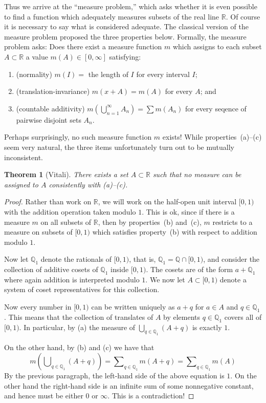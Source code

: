 \documentclass[11pt,oneside]{amsbook}
\newcommand{\QQ}{{\mathbb Q}}
\newcommand{\RR}{{\mathbb R}}
\theoremstyle{definition}
\theoremstyle{plain}
\newtheorem{thm}{Theorem}[section]
\theoremstyle{definition}
\theoremstyle{remark}
\numberwithin{equation}{section}
\numberwithin{figure}{section}
\begin{document}
Thus we arrive at the ``measure problem,'' which asks whether it is even possible to find a function which adequately measures subsets of the real line $\RR$. Of course it is necessary to say what is considered adequate. The classical version of the measure problem proposed the three properties below. Formally, the measure problem asks: Does there exist a measure function $m$ which assigns to each subset $A\subset\RR$ a value $m(A)\in[0,\infty]$ satisfying:
\begin{enumerate}
\item (normality) $m(I)=$ the length of $I$ for every interval $I$;
\item (translation-invariance) $m(x+A)=m(A)$ for every $A$; and
\item (countable additivity) $m(\bigcup_{n=1}^{\infty} A_n)=\sum m(A_n)$ for every seqence of pairwise disjoint sets $A_n$.
\end{enumerate}

Perhaps surprisingly, no such measure function $m$ exists! While properties~(a)--(c) seem very natural, the three items unfortunately turn out to be mutually inconsistent.

\begin{thm}[Vitali]
  There exists a set $A\subset\RR$ such that no measure can be assigned to $A$ consistently with (a)--(c).
\end{thm}

\begin{proof}
  Rather than work on $\RR$, we will work on the half-open unit interval $[0,1)$ with the addition operation taken modulo $1$. This is ok, since if there is a measure $m$ on all subsets of $\RR$, then by properties~(b) and~(c), $m$ restricts to a measure on subsets of $[0,1)$ which satisfies property~(b) with respect to addition modulo $1$.

  Now let $\QQ_1$ denote the rationals of $[0,1)$, that is, $\QQ_1=\QQ\cap[0,1)$, and consider the collection of additive cosets of $\QQ_1$ inside $[0,1)$. The cosets are of the form $a+\QQ_1$ where again addition is interpreted modulo $1$. We now let $A\subset[0,1)$ denote a system of coset representatives for this collection.

  Now every number in $[0,1)$ can be written uniquely as $a+q$ for $a\in A$ and $q\in\QQ_1$. This means that the collection of translates of $A$ by elements $q\in\QQ_1$ covers all of $[0,1)$. In particular, by (a) the measure of $\bigcup_{q\in\QQ_1}(A+q)$ is exactly $1$.

  On the other hand, by (b) and (c) we have that
  \[m\left(\bigcup\nolimits_{q\in\QQ_1}(A+q)\right)
  =\sum\nolimits_{q\in\QQ_1}m(A+q)=\sum\nolimits_{q\in\QQ_1}m(A)
  \]
  By the previous paragraph, the left-hand side of the above equation is $1$. On the other hand the right-hand side is an infinite sum of some nonnegative constant, and hence must be either $0$ or $\infty$. This is a contradiction!
\end{proof}
\end{document}

